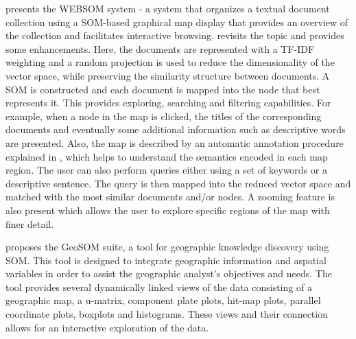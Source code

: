 \documentclass[a4paper]{article}
\begin{document}
\citet{KASKI1998} presents the WEBSOM system - a system that organizes a textual document collection using a SOM-based graphical
map display that provides an overview of the collection and facilitates interactive browsing. \citet{Kohonen2013} revisits the topic and provides some enhancements. Here, the documents are represented with a TF-IDF weighting \citep{KAREN1972} and a random projection is used to reduce the dimensionality of the vector space, while preserving the similarity structure between documents. A SOM is constructed and each document is mapped into the node that best represents it. This provides exploring, searching and filtering capabilities. For example, when a node in the map is clicked, the titles of the corresponding documents and eventually some additional information such as descriptive words are presented. Also, the map is described by an automatic annotation procedure explained in \citet{Lagus1999}, which helps to understand the semantics encoded in each map region. The user can also perform queries either using a set of keywords or a descriptive sentence. The query is then mapped into the reduced vector space and matched with the most similar documents and/or nodes. A zooming feature is also present which allows the user to explore specific regions of the map with finer detail.

\citet{Henriques2012} proposes the GeoSOM suite, a tool for geographic knowledge discovery using SOM. This tool is designed to integrate geographic information and aspatial variables in order to assist the geographic analyst's objectives and needs. The tool provides several dynamically linked views of the data consisting of a geographic map, a u-matrix, component plate plots, hit-map plots, parallel coordinate plots, boxplots and histograms. These views and their connection allows for an interactive exploration of the data.
\end{document}
